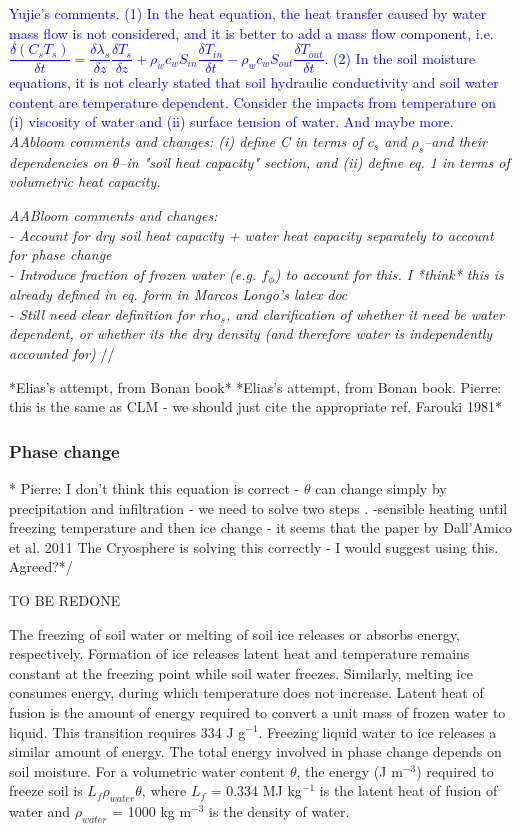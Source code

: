 \textcolor{blue}{Yujie's comments. (1) In the heat equation, the heat transfer caused by water mass flow is not considered, and it is better to add a mass flow component, i.e. $\dfrac{\delta (C_s T_s)}{\delta t} = \dfrac{\delta \lambda_s}{\delta z} \dfrac{\delta T_s}{\delta z} + \rho_w c_w S_{in} \dfrac{\delta T_{in}}{\delta t} - \rho_w c_w S_{out} \dfrac{\delta T_{out}}{\delta t}$. (2) In the soil moisture equations, it is not clearly stated that soil hydraulic conductivity and soil water content are temperature dependent. Consider the impacts from temperature on (i) viscosity of water and (ii) surface tension of water. And maybe more.}
\textit{AAbloom comments and changes:  (i) define C in terms of $c_s$ and $\rho_s$--and their dependencies on $\theta$--in "soil heat capacity" section, and (ii) define eq. 1 in terms of volumetric heat capacity.}


\textit{AABloom comments and changes: 
\\
- Account for dry soil heat capacity + water heat capacity separately to account for phase change
\\
- Introduce fraction of frozen water (e.g. $f_\phi$) to account for this. I *think* this is already defined in eq. form in Marcos Longo's latex doc
\\
- Still need clear definition for $rho_s$, and clarification of whether it need be water dependent, or whether its the dry density (and therefore water is independently accounted for)}
//

*Elias's attempt, from Bonan book*
*Elias's attempt, from Bonan book. Pierre: this is the same as CLM - we should just cite the appropriate ref. Farouki 1981*

\subsubsection{Phase change}

* Pierre: I don't think this equation is correct - $\theta$ can change simply by precipitation and infiltration - we need to solve two steps . -sensible heating until freezing temperature and then ice change - it seems that the paper by Dall’Amico et al. 2011 The Cryosphere is solving this correctly - I would suggest using this. Agreed?*/ 

TO BE REDONE 

The freezing of soil water or melting of soil ice releases or absorbs energy, respectively. Formation of ice releases latent heat and temperature remains constant at the freezing point while soil water freezes. Similarly, melting ice consumes energy, during which temperature does not increase. Latent heat of fusion is the amount of energy required to convert a unit mass of frozen water to liquid. This transition requires 334 J g$^{-1}$. Freezing liquid water to ice releases a similar amount of energy. The total energy involved in phase change depends on soil moisture. For a volumetric water content $\theta$, the energy (J m$^{-3}$) required to freeze soil is $L_f \rho_{water} \theta$, where $L_f$ = 0.334 MJ kg$^{-1}$ is the latent heat of fusion of water and $\rho_{water}$ = 1000 kg m$^{-3}$ is the density of water.

